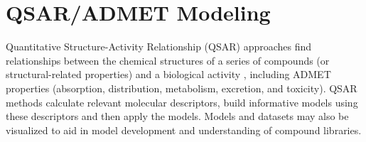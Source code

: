 \section{QSAR/ADMET Modeling}
  
Quantitative Structure-Activity Relationship (QSAR) approaches find relationships between the chemical structures of a series of compounds (or structural-related properties) and a biological activity \cite{1995}, including ADMET properties (absorption, distribution, metabolism, excretion, and toxicity).  QSAR methods calculate relevant molecular descriptors, build informative models using these descriptors and then apply the models.  Models and datasets may also be visualized to aid in model development and understanding of compound libraries.

